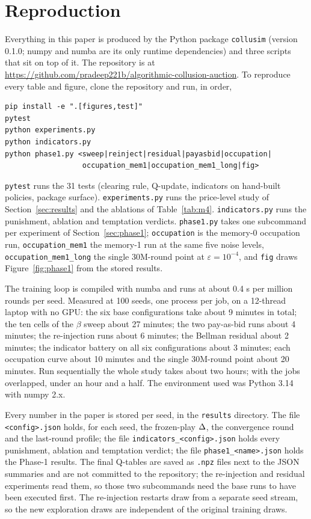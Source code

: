 \section{Reproduction}\label{app:repro}

Everything in this paper is produced by the Python package \texttt{collusim} (version 0.1.0; numpy and numba are its only runtime dependencies) and three scripts that sit on top of it. The repository is at \url{https://github.com/pradeep221b/algorithmic-collusion-auction}. To reproduce every table and figure, clone the repository and run, in order,
\begin{verbatim}
pip install -e ".[figures,test]"
pytest
python experiments.py
python indicators.py
python phase1.py <sweep|reinject|residual|payasbid|occupation|
                  occupation_mem1|occupation_mem1_long|fig>
\end{verbatim}
\texttt{pytest} runs the 31 tests (clearing rule, Q-update, indicators on hand-built policies, package surface). \texttt{experiments.py} runs the price-level study of Section~\ref{sec:results} and the ablations of Table~\ref{tab:m4}. \texttt{indicators.py} runs the punishment, ablation and temptation verdicts. \texttt{phase1.py} takes one subcommand per experiment of Section~\ref{sec:phase1}; \texttt{occupation} is the memory-0 occupation run, \texttt{occupation\_mem1} the memory-1 run at the same five noise levels, \texttt{occupation\_mem1\_long} the single 30M-round point at $\varepsilon = 10^{-4}$, and \texttt{fig} draws Figure~\ref{fig:phase1} from the stored results.

The training loop is compiled with numba and runs at about 0.4 s per million rounds per seed. Measured at 100 seeds, one process per job, on a 12-thread laptop with no GPU: the six base configurations take about 9 minutes in total; the ten cells of the $\beta$ sweep about 27 minutes; the two pay-as-bid runs about 4 minutes; the re-injection runs about 6 minutes; the Bellman residual about 2 minutes; the indicator battery on all six configurations about 3 minutes; each occupation curve about 10 minutes and the single 30M-round point about 20 minutes. Run sequentially the whole study takes about two hours; with the jobs overlapped, under an hour and a half. The environment used was Python 3.14 with numpy 2.x.

Every number in the paper is stored per seed, in the \texttt{results} directory. The file \texttt{<config>.json} holds, for each seed, the frozen-play $\Delta$, the convergence round and the last-round profile; the file \texttt{indicators\_\allowbreak<config>.json} holds every punishment, ablation and temptation verdict; the file \texttt{phase1\_\allowbreak<name>.json} holds the Phase-1 results. The final Q-tables are saved as \texttt{.npz} files next to the JSON summaries and are not committed to the repository; the re-injection and residual experiments read them, so those two subcommands need the base runs to have been executed first. The re-injection restarts draw from a separate seed stream, so the new exploration draws are independent of the original training draws.

